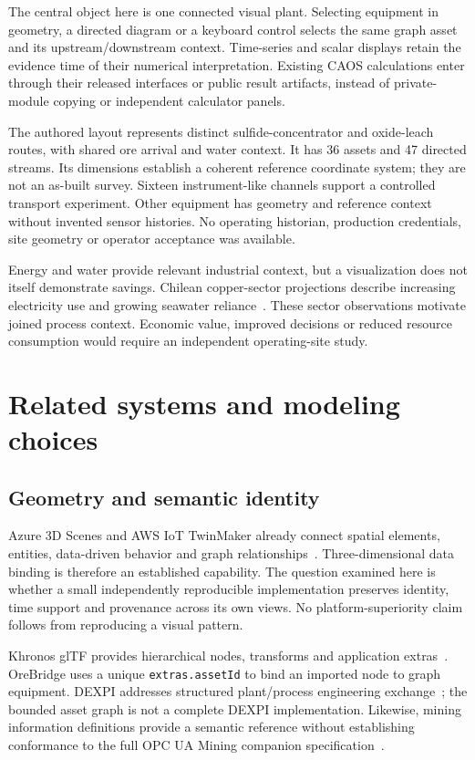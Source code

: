 \documentclass[11pt,a4paper]{article}
\begin{document}
The central object here is one connected visual plant. Selecting equipment in geometry, a directed diagram or a keyboard control selects the same graph asset and its upstream/downstream context. Time-series and scalar displays retain the evidence time of their numerical interpretation. Existing CAOS calculations enter through their released interfaces or public result artifacts, instead of private-module copying or independent calculator panels.

The authored layout represents distinct sulfide-concentrator and oxide-leach routes, with shared ore arrival and water context. It has 36 assets and 47 directed streams. Its dimensions establish a coherent reference coordinate system; they are not an as-built survey. Sixteen instrument-like channels support a controlled transport experiment. Other equipment has geometry and reference context without invented sensor histories. No operating historian, production credentials, site geometry or operator acceptance was available.

Energy and water provide relevant industrial context, but a visualization does not itself demonstrate savings. Chilean copper-sector projections describe increasing electricity use and growing seawater reliance~\cite{cochilco-energy,cochilco-water}. These sector observations motivate joined process context. Economic value, improved decisions or reduced resource consumption would require an independent operating-site study.

\section{Related systems and modeling choices}
\subsection{Geometry and semantic identity}
Azure 3D Scenes and AWS IoT TwinMaker already connect spatial elements, entities, data-driven behavior and graph relationships~\cite{azure,aws}. Three-dimensional data binding is therefore an established capability. The question examined here is whether a small independently reproducible implementation preserves identity, time support and provenance across its own views. No platform-superiority claim follows from reproducing a visual pattern.

Khronos glTF provides hierarchical nodes, transforms and application extras~\cite{gltf}. OreBridge uses a unique \texttt{extras.assetId} to bind an imported node to graph equipment. DEXPI addresses structured plant/process engineering exchange~\cite{dexpi}; the bounded asset graph is not a complete DEXPI implementation. Likewise, mining information definitions provide a semantic reference without establishing conformance to the full OPC UA Mining companion specification~\cite{mining}.
\end{document}
